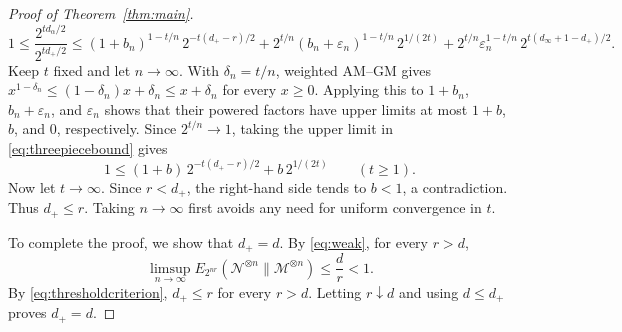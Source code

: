 \documentclass[10pt,a4paper]{amsart}
\newcommand{\M}{\mathcal M}
\newcommand{\N}{\mathcal N}
\theoremstyle{plain}
\begin{document}
\begin{proof}[Proof of Theorem~\ref{thm:main}]
\begin{equation}
 1\le\frac{2^{td_\alpha/2}}{2^{td_+/2}}
 \le(1+b_n)^{1-t/n}\,2^{-t(d_+-r)/2}
 +2^{t/n}(b_n+\varepsilon_n)^{1-t/n}\,2^{1/(2t)}
 +2^{t/n}\varepsilon_n^{1-t/n}\,2^{t(d_\infty+1-d_+)/2}.
\end{equation}
Keep $t$ fixed and let $n\to\infty$. With $\delta_n=t/n$, weighted AM--GM gives $x^{1-\delta_n}\le(1-\delta_n)x+\delta_n\le x+\delta_n$ for every $x\ge0$. Applying this to $1+b_n$, $b_n+\varepsilon_n$, and $\varepsilon_n$ shows that their powered factors have upper limits at most $1+b$, $b$, and $0$, respectively. Since $2^{t/n}\to1$, taking the upper limit in \eqref{eq:threepiecebound} gives
\begin{equation}\label{eq:contradiction}
 1\le(1+b)\,2^{-t(d_+-r)/2}+b\,2^{1/(2t)}
 \qquad(t\ge1).
\end{equation}
Now let $t\to\infty$. Since $r<d_+$, the right-hand side tends to $b<1$, a contradiction. Thus $d_+\le r$. Taking $n\to\infty$ first avoids any need for uniform convergence in $t$.

To complete the proof, we show that $d_+=d$. By \eqref{eq:weak}, for every $r>d$,
\[
 \limsup_{n\to\infty}E_{2^{nr}}(\N^{\otimes n}\|\M^{\otimes n})
 \le\frac dr<1.
\]
By \eqref{eq:thresholdcriterion}, $d_+\le r$ for every $r>d$. Letting $r\downarrow d$ and using $d\le d_+$ proves $d_+=d$.
\end{proof}
\end{document}
